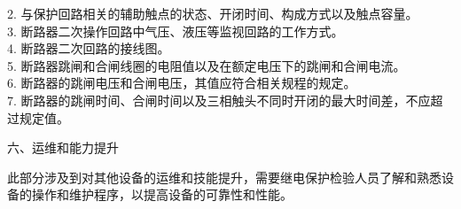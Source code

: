 2.	与保护回路相关的辅助触点的状态、开闭时间、构成方式以及触点容量。\\
3.	断路器二次操作回路中气压、液压等监视回路的工作方式。\\
4.	断路器二次回路的接线图。\\
5.	断路器跳闸和合闸线圈的电阻值以及在额定电压下的跳闸和合闸电流。\\
6.	断路器的跳闸电压和合闸电压，其值应符合相关规程的规定。\\
7.	断路器的跳闸时间、合闸时间以及三相触头不同时开闭的最大时间差，不应超过规定值。\par
六、运维和能力提升\par
此部分涉及到对其他设备的运维和技能提升，需要继电保护检验人员了解和熟悉设备的操作和维护程序，以提高设备的可靠性和性能。
\addtocounter{page}{-1}

